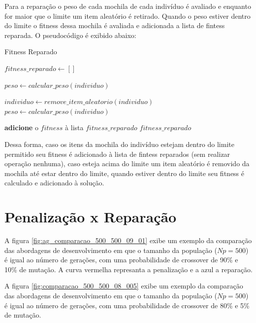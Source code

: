 \documentclass[11pt]{article}
\begin{document}
Para a reparação o peso de cada mochila de cada indivíduo é avaliado e enquanto for maior que o limite um item aleatório é retirado. Quando o peso estiver dentro do limite o fitness dessa mochila é avaliada e adicionada a lista de fintess reparada. O pseudocódigo é exibido abaixo: 


\begin{algorithm}
	\caption{Fitness Reparado}\label{euclid}
	\begin{algorithmic}[1]
		
			\State $fitness\_reparado \gets []$
			
				\State $peso \gets calcular\_peso(individuo)$
				
					\State $ individuo \gets remove\_item\_aleatorio(individuo) $
					\State $peso \gets calcular\_peso(individuo)$
				
				
				\State \textbf{adicione} o $fitness$ à lista $fitness\_reparado$
			\State \Return $fitness\_reparado$
		\EndFunction
	\end{algorithmic}
\end{algorithm}

Dessa forma, caso os itens da mochila do indivíduo estejam dentro do limite permitido seu fitness é adicionado à lista de fintess reparados (sem realizar operação nenhuma), caso esteja acima do limite um item aleatório é removido da mochila até estar dentro do limite, quando estiver dentro do limite seu fitness é calculado e adicionado à solução.

\section{Penalização x Reparação}

A figura \ref{fig:ag_comparacao_500_500_09_01} exibe um exemplo da comparação das abordagens de desenvolvimento em que o tamanho da população  ($Np = 500$) é igual ao número de gerações, com uma probabilidade de crossover de 90\% e 10\% de mutação. A curva vermelha represanta a penalização e a azul a reparação.

A figura \ref{fig:comparacao_500_500_08_005} exibe um exemplo da comparação das abordagens de desenvolvimento em que o tamanho da população  ($Np = 500$) é igual ao número de gerações, com uma probabilidade de crossover de 80\% e 5\% de mutação.
\end{document}
